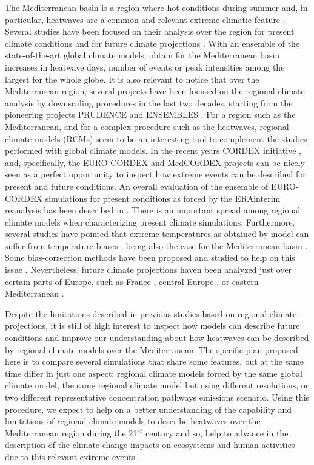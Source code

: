 The Mediterranean basin is a region where hot conditions during summer and, in
particular, heatwaves  are a common and relevant extreme climatic feature
\cite{lio_al2006, sch_al2004, ste_al2012}. Several studies have been focused
on their analysis over the region for present climate conditions and for future climate projections 
\cite{del_al2007,fis_al2007,gio_lio2008,fis_sch2010,bar_al2011,vau_al2013,
chr_al2015,rus_al2015,don_al2016,don_al2017,san_al2018}. With an ensemble of the
state-of-the-art global climate models,
\cite{per_gib2017} obtain for the Mediterranean basin increases in heatwave days, number
of events or peak intensities among the largest for the whole globe.
It is also relevant to notice that over the Mediterranean region, several projects
have been focused on the regional climate analysis by downscaling procedures in
the last two decades, starting from the pioneering projects PRUDENCE \cite{san_al2004, jac_al2007}
and ENSEMBLES \cite{van_mit2009}. For a region such as the Mediterranean,
and for a complex procedure such as the heatwaves, regional climate models (RCMs)
seem to be an interesting tool to complement the studies performed with
global climate models. In the recent years CORDEX initiative \cite{gio_gut2015},
and, specifically, the EURO-CORDEX \cite{jac_al2014,kot_al2014} and MedCORDEX \cite{rut_al2016}
projects can be nicely seen as a perfect opportunity to inspect how extreme
events can be described for present and future conditions. An overall
evaluation of the ensemble of EURO-CORDEX simulations for present conditions
as forced by the ERAinterim reanalysis \cite{dee_al2011} has been described in \cite{vau_al2013}.
There is an important spread among regional climate models when characterizing present
climate simulations. Furthermore, several studies have pointed that extreme
temperatures as obtained by model can suffer from temperature biases \cite{chr_bob2012},
being also the case for the Mediterranean basin \cite{bob_al2012}.
Some bias-correction methods have been proposed and studied to help on this 
issue \cite{dos2016,dos_fis2018}. Nevertheless, future climate projections
haven been analyzed just over certain parts of Europe, such as France \cite{ouz_al2016},
central Europe \cite{lho_al2018}, or eastern Mediterranean \cite{zit_al2016}.

Despite the limitations described in previous studies based on regional climate
projections, 
it is still of  high interest to inspect how models can describe future 
conditions and 
improve our understanding about how heatwaves can be described by regional climate
models over the Mediterranean. The specific plan proposed
here is to compare several simulations that share some features, but at
the same time differ in just one aspect: regional climate models
forced by the same global climate model, the same regional climate model
but using different resolutions, or two different representative concentration
pathways emissions
scenario. Using this procedure, we expect
to help on a better understanding of the capability and limitations
of regional climate models to describe heatwaves over the Mediterranean
region during the 21$^{st}$ century and so, help to
advance in the description of the climate change impacts on ecosystems and human
activities due to this relevant extreme events. 

